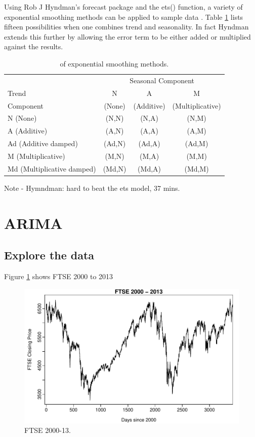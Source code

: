Using Rob J Hyndman's forecast package and the ets() function, a variety of exponential smoothing methods can be applied to sample data \citep{Hyndman08automatictime}. Table \ref{tab:tax_em} lists fifteen possibilities when one combines trend and seasonality. In fact Hyndman extends this further by allowing the error term to be either added or multiplied against the results. 

\begin{table}[ht]
\centering
\caption[Taxonomy of exponential smoothing methods.]{of exponential smoothing methods.} 
\label{tab:tax_em}
\begin{tabular}{lccc}
  \toprule 
            & \multicolumn{3}{c}{Seasonal Component} \\
  \cmidrule(r){2-4}
  Trend     & N      & A          & M       \\ 
  Component &(None)  &(Additive)  & (Multiplicative)  \\
  \midrule 
  N (None) & (N,N)&(N,A)&(N,M)  \\ 
  A (Additive) & (A,N)&	(A,A)&(A,M)  \\ 
  Ad (Additive damped) &(Ad,N)&(Ad,A)&(Ad,M) \\ 
  M (Multiplicative) &(M,N)&(M,A)&(M,M)  \\ 
  Md (Multiplicative damped) &(Md,N)&(Md,A)&(Md,M) \\ 
   \bottomrule \end{tabular}
\end{table}

Note - Hymndman: hard to beat the ets model, 37 mins.


\newpage
\section{ARIMA}

\subsection{Explore the data}

Figure \ref{fig:chp_ts_ftse_2000_13} shows FTSE 2000 to 2013

\begin{figure}[tbh]
\centering
\includegraphics{Figures/chp_ts_ftse_2000-13}
\caption[FTSE 2000-13.]{FTSE 2000-13.}
\label{fig:chp_ts_ftse_2000_13}
\end{figure}

